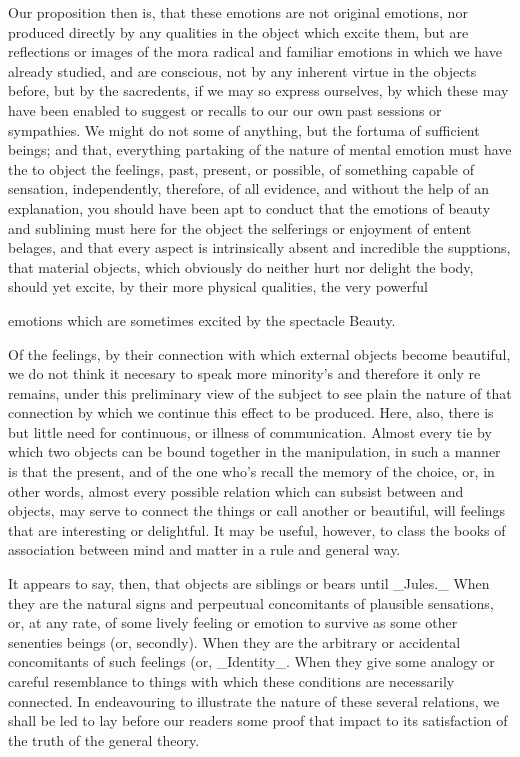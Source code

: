 \documentclass{article}
\begin{document}
Our proposition then is, that these emotions are not original emotions, nor produced directly by any qualities in the object which excite them, but are reflections or images of the mora radical and familiar emotions in which we have already studied, and are conscious, not by any inherent virtue in the objects before, but by the sacredents, if we may so express ourselves, by which these may have been enabled to suggest or recalls to our our own past sessions or sympathies. We might do not some of anything, but the fortuma of sufficient beings; and that, everything partaking of the nature of mental emotion must have the to object the feelings, past, present, or possible, of something capable of sensation, independently, therefore, of all evidence, and without the help of an explanation, you should have been apt to conduct that the emotions of beauty and sublining must here for the object the selferings or enjoyment of entent belages, and that every aspect is intrinsically absent and incredible the supptions, that material objects, which obviously do neither hurt nor delight the body, should yet excite, by their more physical qualities, the very powerful

emotions which are sometimes excited by the spectacle Beauty.

Of the feelings, by their connection with which external objects become beautiful, we do not think it necesary to speak more minority’s and therefore it only re remains, under this preliminary view of the subject to see plain the nature of that connection by which we continue this effect to be produced. Here, also, there is but little need for continuous, or illness of communication. Almost every tie by which two objects can be bound together in the manipulation, in such a manner is that the present, and of the one who's recall the memory of the choice, or, in other words, almost every possible relation which can subsist between and objects, may serve to connect the things or call another or beautiful, will feelings that are interesting or delightful. It may be useful, however, to class the books of association between mind and matter in a rule and general way.

It appears to say, then, that objects are siblings or bears until \_Jules.\_ When they are the natural signs and perpeutual concomitants of plausible sensations, or, at any rate, of some lively feeling or emotion to survive as some other senenties beings (or, secondly). When they are the arbitrary or accidental concomitants of such feelings (or, \_Identity\_. When they give some analogy or careful resemblance to things with which these conditions are necessarily connected. In endeavouring to illustrate the nature of these several relations, we shall be led to lay before our readers some proof that impact to its satisfaction of the truth of the general theory.
\end{document}
